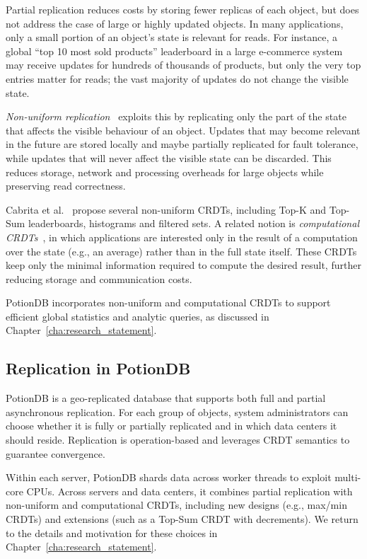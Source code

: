 Partial replication reduces costs by storing fewer replicas of each object, but
does not address the case of large or highly updated objects. In many
applications, only a small portion of an object’s state is relevant for reads.
For instance, a global “top 10 most sold products” leaderboard in a large
e-commerce system may receive updates for hundreds of thousands of products, but
only the very top entries matter for reads; the vast majority of updates do not
change the visible state.

\emph{Non-uniform replication}~\cite{nonUniform} exploits this by
replicating only the part of the state that affects the visible behaviour of an
object. Updates that may become relevant in the future are stored locally and
maybe partially replicated for fault tolerance, while updates that will never
affect the visible state can be discarded. This reduces storage, network and
processing overheads for large objects while preserving read correctness.

Cabrita et al.~\cite{nonUniform,nonUniformThesis} propose several
non-uniform CRDTs, including Top-K and Top-Sum leaderboards, histograms and
filtered sets. A related notion is \emph{computational CRDTs}~\cite{computationalCrdt},
in which applications are interested only in the result of a computation over the
state (e.g., an average) rather than in the full state itself. These CRDTs keep
only the minimal information required to compute the desired result, further
reducing storage and communication costs.

PotionDB incorporates non-uniform and computational CRDTs to support efficient
global statistics and analytic queries, as discussed in Chapter~\ref{cha:research_statement}.

\subsection{Replication in PotionDB}

PotionDB is a geo-replicated database that supports both full and partial
asynchronous replication. For each group of objects, system administrators can
choose whether it is fully or partially replicated and in which data centers it
should reside. Replication is operation-based and leverages CRDT semantics to
guarantee convergence.

Within each server, PotionDB shards data across worker threads to exploit
multi-core CPUs. Across servers and data centers, it combines partial
replication with non-uniform and computational CRDTs, including new designs
(e.g., max/min CRDTs) and extensions (such as a Top-Sum CRDT with decrements).
We return to the details and motivation for these choices in
Chapter~\ref{cha:research_statement}.


